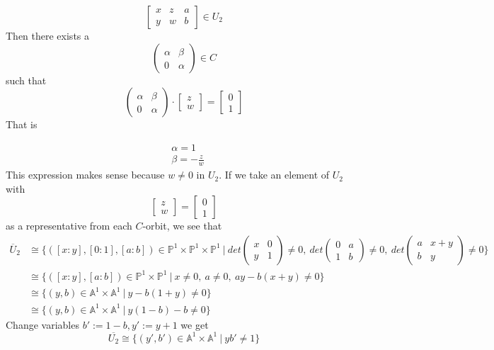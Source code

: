 \begin{example}
\[\begin{bmatrix}
	x&z&a\\
	y&w&b
	\end{bmatrix}
	\in U_2
\]
Then there exists a 
\[
	\begin{pmatrix}
		\alpha & \beta\\
		0 & \alpha 
	\end{pmatrix}
	\in
	C
\]
such that
\[
	\begin{pmatrix}
		\alpha & \beta\\
		0 & \alpha 	
	\end{pmatrix}
	\cdot
	\begin{bmatrix}
		z\\
		w
	\end{bmatrix}
	=
	\begin{bmatrix}
		0\\
		1
	\end{bmatrix}	
\] 
That is 

	\begin{align*}
		&\alpha=1\\
		&\beta=-\frac{z}{w}
	\end{align*}
This expression makes sense because $w\neq 0$ in $U_2$.
If we take an element of $U_2$ with 
\[
	\begin{bmatrix}
		z\\
		w
	\end{bmatrix}
	=
	\begin{bmatrix}
		0\\
		1
	\end{bmatrix}	
\]
as a representative from each $C$-orbit, we see that 
\begin{align*}
	\overline{U}_2
	&\cong
	\{
	([x:y],[0:1],[a:b])\in \mathbb{P}^1 \times \mathbb{P}^1\times \mathbb{P}^1~|~
	det	
	\begin{pmatrix}
	x&0\\
	y&1
	\end{pmatrix}
	\neq 0,~
	det	
	\begin{pmatrix}
	0&a\\
	1&b
	\end{pmatrix}
	\neq 0,~
	det	
	\begin{pmatrix}
	a&x+y\\
	b&y
	\end{pmatrix}
	\neq 0	 	
	\}	
	\\
	&\cong
	\{
	([x:y],[a:b])\in \mathbb{P}^1\times \mathbb{P}^1~|~
	x\neq 0,~
	a\neq 0,~
	ay-b(x+y)\neq 0	 	
	\}\\
	&\cong
	\{
	(y,b)\in \mathbb{A}^1\times \mathbb{A}^1~|~
	y-b(1+y)\neq 0	 	
	\}\\
	&\cong
	\{
	(y,b)\in \mathbb{A}^1\times \mathbb{A}^1~|~
	y(1-b)-b\neq 0	 	
	\}	
\end{align*}
Change variables $b':=1-b,y':=y+1$ we get
\[
	\overline{U_2}
	\cong
	\{
	(y',b')\in \mathbb{A}^1\times \mathbb{A}^1~|~
	yb'\neq 1
	\}
\]


\end{example}
